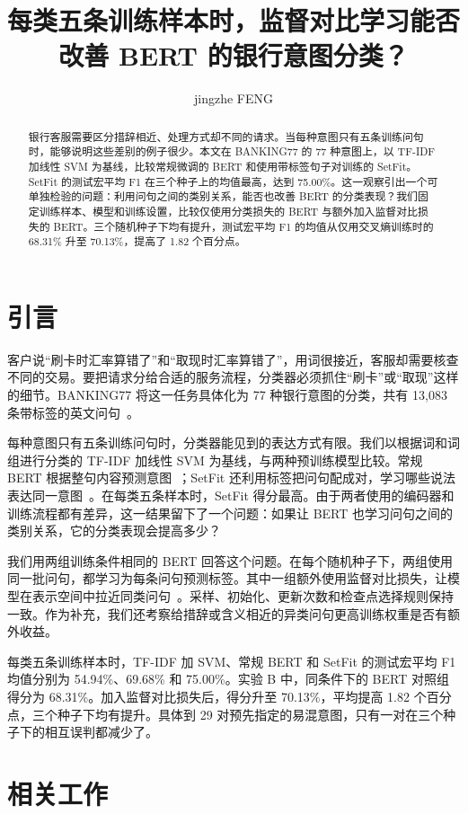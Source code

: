 \documentclass[runningheads]{llncs}
\title{每类五条训练样本时，监督对比学习能否改善 BERT 的银行意图分类？}
\author{jingzhe FENG}
\institute{香港城市大学（东莞）\\学号：72655564}
\begin{document}
\maketitle
\begin{abstract}
银行客服需要区分措辞相近、处理方式却不同的请求。当每种意图只有五条训练问句时，能够说明这些差别的例子很少。本文在 BANKING77 的 77 种意图上，以 TF-IDF 加线性 SVM 为基线，比较常规微调的 BERT 和使用带标签句子对训练的 SetFit。SetFit 的测试宏平均 F1 在三个种子上的均值最高，达到 75.00\%。这一观察引出一个可单独检验的问题：利用问句之间的类别关系，能否也改善 BERT 的分类表现？我们固定训练样本、模型和训练设置，比较仅使用分类损失的 BERT 与额外加入监督对比损失的 BERT。三个随机种子下均有提升，测试宏平均 F1 的均值从仅用交叉熵训练时的 68.31\% 升至 70.13\%，提高了 1.82 个百分点。
\end{abstract}

\section{引言}
客户说“刷卡时汇率算错了”和“取现时汇率算错了”，用词很接近，客服却需要核查不同的交易。要把请求分给合适的服务流程，分类器必须抓住“刷卡”或“取现”这样的细节。BANKING77 将这一任务具体化为 77 种银行意图的分类，共有 13,083 条带标签的英文问句~\cite{banking}。

每种意图只有五条训练问句时，分类器能见到的表达方式有限。我们以根据词和词组进行分类的 TF-IDF 加线性 SVM 为基线，与两种预训练模型比较。常规 BERT 根据整句内容预测意图~\cite{bert}；SetFit 还利用标签把问句配成对，学习哪些说法表达同一意图~\cite{setfit}。在每类五条样本时，SetFit 得分最高。由于两者使用的编码器和训练流程都有差异，这一结果留下了一个问题：如果让 BERT 也学习问句之间的类别关系，它的分类表现会提高多少？

我们用两组训练条件相同的 BERT 回答这个问题。在每个随机种子下，两组使用同一批问句，都学习为每条问句预测标签。其中一组额外使用监督对比损失，让模型在表示空间中拉近同类问句~\cite{supcon,gunel}。采样、初始化、更新次数和检查点选择规则保持一致。作为补充，我们还考察给措辞或含义相近的异类问句更高训练权重是否有额外收益。

每类五条训练样本时，TF-IDF 加 SVM、常规 BERT 和 SetFit 的测试宏平均 F1 均值分别为 54.94\%、69.68\% 和 75.00\%。实验 B 中，同条件下的 BERT 对照组得分为 68.31\%。加入监督对比损失后，得分升至 70.13\%，平均提高 1.82 个百分点，三个种子下均有提升。具体到 29 对预先指定的易混意图，只有一对在三个种子下的相互误判都减少了。

\section{相关工作}
\end{document}
